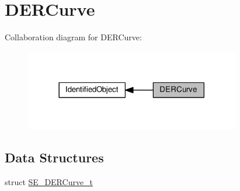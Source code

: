 \hypertarget{group__DERCurve}{}\section{D\+E\+R\+Curve}
\label{group__DERCurve}
Collaboration diagram for D\+E\+R\+Curve\+:\nopagebreak
\begin{figure}[H]
\begin{center}
\leavevmode
\includegraphics[width=266pt]{group__DERCurve}
\end{center}
\end{figure}
\subsection*{Data Structures}
\begin{DoxyCompactItemize}
\item 
struct \hyperlink{structSE__DERCurve__t}{S\+E\+\_\+\+D\+E\+R\+Curve\+\_\+t}
\end{DoxyCompactItemize}
